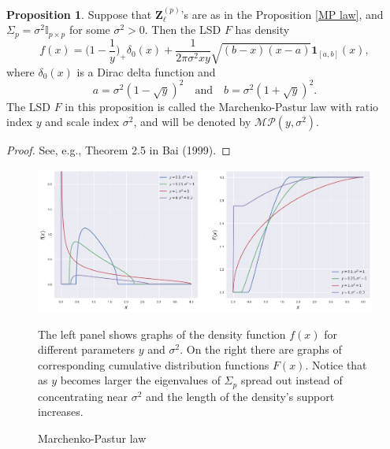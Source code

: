 \documentclass[a4paper,11pt]{article}
\theoremstyle{plain}
\theoremstyle{definition}
\newtheorem{prps}[thm]{Proposition}
\begin{document}
	\begin{prps} \label{one-dim MP}
		Suppose that $\mathbf{Z}_\ell^{(p)}$'s are as in the Proposition \ref{MP law}, and $\Sigma_p = \sigma^2 \mathbb{I}_{p \times p}$ for some $\sigma^2>0$. Then the LSD $F$ has density
		\[ f(x) = \Big(1-\frac{1}{y}\Big)_+\delta_0(x) + \frac{1}{2 \pi \sigma^2 xy} \sqrt{(b-x)(x-a)} \mathbf{1}_{[a,b]}(x), \]
		where $\delta_0(x)$ is a Dirac delta function and
		\[ a = \sigma^2(1-\sqrt{y})^2 \quad \text{and} \quad b = \sigma^2(1+\sqrt{y})^2. \]
		The LSD $F$ in this proposition is called the Marchenko-Pastur law with ratio index $y$ and scale index $\sigma^2$, and will be denoted by $\mathcal{MP}(y, \sigma^2)$.
	\end{prps}
	\begin{proof}
		See, e.g., Theorem 2.5 in Bai (1999).
	\end{proof}
	\begin{figure}
		\begin{center} \centering
			\includegraphics[scale=0.4]{MP}
			\caption{Marchenko-Pastur law}
			\smallskip
			\small
			The left panel shows graphs of the density function $f(x)$ for different parameters $y$ and $\sigma^2$. On the right there are graphs of corresponding cumulative distribution functions $F(x)$. Notice that as $y$ becomes larger the eigenvalues of $\Sigma_p$ spread out instead of concentrating near $\sigma^2$ and the length of the density's support increases.
		\end{center}
	\end{figure}
	
\end{document}

